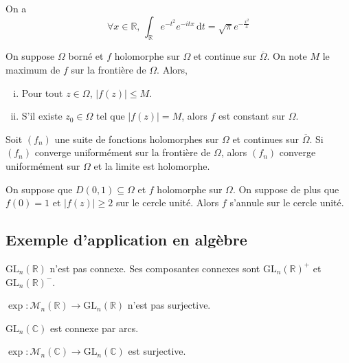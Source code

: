 	
	\begin{application}
		On a
		\[ \forall x \in \mathbb{R}, \, \int_{\mathbb{R}} e^{-t^2} e^{-itx} \, \mathrm{d}t = \sqrt{\pi} e^{-\frac{x^2}{4}} \]
	\end{application}
	
	
	\begin{theorem}
		On suppose $\Omega$ borné et $f$ holomorphe sur $\Omega$ et continue sur $\overline{\Omega}$. On note $M$ le maximum de $f$ sur la frontière de $\Omega$. Alors,
		\begin{enumerate}[(i)]
			\item Pour tout $z \in \Omega$, $\vert f(z) \vert \leq M$.
			\item S'il existe $z_0 \in \Omega$ tel que $\vert f(z) \vert = M$, alors $f$ est constant sur $\Omega$.
		\end{enumerate}
	\end{theorem}
	
	
	\begin{application}
		Soit $(f_n)$ une suite de fonctions holomorphes sur $\Omega$ et continues sur $\overline{\Omega}$. Si $(f_n)$ converge uniformément sur la frontière de $\Omega$, alors $(f_n)$ converge uniformément sur $\Omega$ et la limite est holomorphe.
	\end{application}
	
	\begin{application}
		On suppose que $D(0,1) \subseteq \Omega$ et $f$ holomorphe sur $\Omega$. On suppose de plus que $f(0) = 1$ et $\vert f(z) \vert \geq 2$ sur le cercle unité. Alors $f$ s'annule sur le cercle unité.
	\end{application}
	
	\subsection{Exemple d'application en algèbre}
	
	
	\begin{proposition}
		$\mathrm{GL}_n(\mathbb{R})$ n'est pas connexe. Ses composantes connexes sont $\mathrm{GL}_n(\mathbb{R})^+$ et $\mathrm{GL}_n(\mathbb{R})^-$.
	\end{proposition}
	
	\begin{application}
		$\exp : \mathcal{M}_n(\mathbb{R}) \rightarrow \mathrm{GL}_n(\mathbb{R})$ n'est pas surjective.
	\end{application}
	
	
	\begin{proposition}
		$\mathrm{GL}_n(\mathbb{C})$ est connexe par arcs.
	\end{proposition}
	
	\begin{application}
		$\exp : \mathcal{M}_n(\mathbb{C}) \rightarrow \mathrm{GL}_n(\mathbb{C})$ est surjective.
	\end{application}

